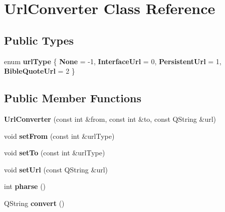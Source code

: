 \hypertarget{classUrlConverter}{
\section{UrlConverter Class Reference}
\label{classUrlConverter}
}
\subsection*{Public Types}
\begin{DoxyCompactItemize}
\item 
enum {\bfseries urlType} \{ {\bfseries None} =  -\/1, 
{\bfseries InterfaceUrl} =  0, 
{\bfseries PersistentUrl} =  1, 
{\bfseries BibleQuoteUrl} =  2
 \}
\end{DoxyCompactItemize}
\subsection*{Public Member Functions}
\begin{DoxyCompactItemize}
\item 
\hypertarget{classUrlConverter_a4630a4d0f2859c6a69b9b887c4dd2348}{
{\bfseries UrlConverter} (const int \&from, const int \&to, const QString \&url)}
\label{classUrlConverter_a4630a4d0f2859c6a69b9b887c4dd2348}

\item 
\hypertarget{classUrlConverter_ae6bbd7aee85b38db914075538fad59fe}{
void {\bfseries setFrom} (const int \&urlType)}
\label{classUrlConverter_ae6bbd7aee85b38db914075538fad59fe}

\item 
\hypertarget{classUrlConverter_a7f080e5e5df0db8899e4524262fdcc40}{
void {\bfseries setTo} (const int \&urlType)}
\label{classUrlConverter_a7f080e5e5df0db8899e4524262fdcc40}

\item 
\hypertarget{classUrlConverter_a4f8f9d4f7ed8c0ecbf9b5d10ef04c3cd}{
void {\bfseries setUrl} (const QString \&url)}
\label{classUrlConverter_a4f8f9d4f7ed8c0ecbf9b5d10ef04c3cd}

\item 
\hypertarget{classUrlConverter_aa1c733acf14d4c4710b69b8044deb766}{
int {\bfseries pharse} ()}
\label{classUrlConverter_aa1c733acf14d4c4710b69b8044deb766}

\item 
\hypertarget{classUrlConverter_a386d9d99395bdd7a6be868567deb7019}{
QString {\bfseries convert} ()}
\label{classUrlConverter_a386d9d99395bdd7a6be868567deb7019}

\end{DoxyCompactItemize}
